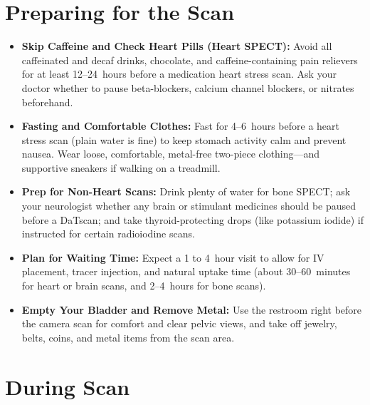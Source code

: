 \section{Preparing for the Scan}

\begin{itemize}
    \item \textbf{Skip Caffeine and Check Heart Pills (Heart SPECT):} Avoid all caffeinated and decaf drinks, chocolate, and caffeine-containing pain relievers for at least 12--24~hours before a medication heart stress scan. Ask your doctor whether to pause beta-blockers, calcium channel blockers, or nitrates beforehand.
    \item \textbf{Fasting and Comfortable Clothes:} Fast for 4--6~hours before a heart stress scan (plain water is fine) to keep stomach activity calm and prevent nausea. Wear loose, comfortable, metal-free two-piece clothing---and supportive sneakers if walking on a treadmill.
    \item \textbf{Prep for Non-Heart Scans:} Drink plenty of water for bone SPECT; ask your neurologist whether any brain or stimulant medicines should be paused before a DaTscan; and take thyroid-protecting drops (like potassium iodide) if instructed for certain radioiodine scans.
    \item \textbf{Plan for Waiting Time:} Expect a 1 to 4~hour visit to allow for IV placement, tracer injection, and natural uptake time (about 30--60~minutes for heart or brain scans, and 2--4~hours for bone scans).
    \item \textbf{Empty Your Bladder and Remove Metal:} Use the restroom right before the camera scan for comfort and clear pelvic views, and take off jewelry, belts, coins, and metal items from the scan area.
\end{itemize}

\section{During Scan}

